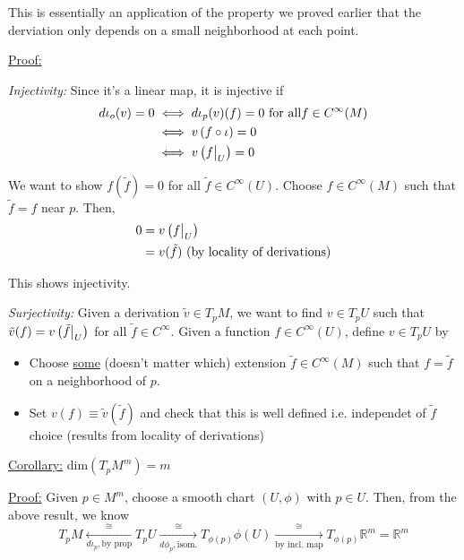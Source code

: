 \documentclass{article}
\newcommand{\R}{\mathbb{R}}
\newcommand{\restr}[2]{{%
  \left.\kern-\nulldelimiterspace %
  #1 %
  \vphantom{\big|} %
  \right|_{#2} %
  }}
\begin{document}
\vskip 0.5cm
This is essentially an application of the property we proved earlier that the derviation only depends on a small neighborhood at each point.

\vskip 0.5cm
\underline{Proof:} 

\vskip 0.5cm
\emph{Injectivity:} Since it's a linear map, it is injective if 
\begin{align*}
  d \iota_o(v) = 0 &\iff d\iota_p(v) (f) = 0 \text{ for all} f \in C^{\infty}(M) \\
  &\iff v \left( f \circ \iota \right) = 0 \\
  &\iff v \left( \restr{f}{U} \right) = 0 
\end{align*}

We want to show $f(\tilde{f}) = 0$ for all $\tilde{f} \in C^{\infty}(U)$. Choose $f \in C^{\infty}(M)$ such that $\tilde{f} = f$ near $p$. Then, 
\begin{align*}
  0 &= v \left( \restr{f}{U} \right) \\
  &= v(\tilde{f}) \text{  (by locality of derivations)}
\end{align*}

This shows injectivity.

\vskip 0.5cm
\emph{Surjectivity:} Given a derivation $\tilde{v} \in T_pM$, we want to find $v \in T_pU$ such that $\tilde{v}(f) = v\left( \restr{\tilde{f}}{U} \right)$ for all $\tilde{f} \in C^{\infty}$. Given a function $f \in C^{\infty}(U)$, define $v \in T_pU$ by 
\begin{itemize}
  \item Choose \underline{some} (doesn't matter which) extension $\tilde{f} \in C^{\infty}(M)$ such that $f = \tilde{f}$ on a neighborhood of $p$.
  \item Set $v(f) \equiv \tilde{v}(\tilde{f})$ and check that this is well defined i.e. independet of $\tilde{f}$ choice (results from locality of derivations)
\end{itemize}

\vskip 0.5cm
\begin{dottedbox}
  \underline{Corollary:} dim$\left( T_pM^m \right) = m$
  
  \vskip 0.5cm
  \underline{Proof:} Given $p \in M^m$, choose a smooth chart $(U, \phi)$ with $p \in U$. Then, from the above result, we know 
  \[ T_pM \xleftarrow[d \iota_p, \text{by prop} ]{\cong} T_pU \xrightarrow[d \phi_p, \text{isom.}]{\cong} T_{\phi(p)} \phi(U) \xrightarrow[\text{by incl. map}]{\cong} T_{\phi(p)} \R^m = \R^m \]
\end{dottedbox}
\end{document}
